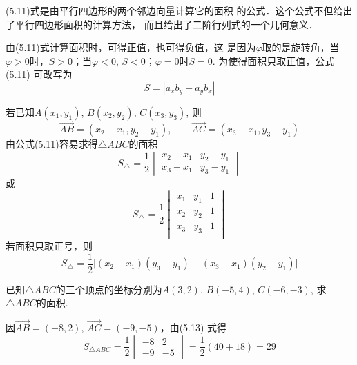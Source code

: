 (5.11)式是由平行四边形的两个邻边向量计算它的面积
的公式．这个公式不但给出了平行四边形面积的计算方法，
而且给出了二阶行列式的一个几何意义．

由(5.11)式计算面积时，可得正值，也可得负值，这
是因为$\varphi$取的是旋转角，当$\varphi>0$时，$S>0$；当$\varphi<0$, 
$S<0$；$\varphi=0$时$S=0$. 为使得面积只取正值，公式(5.11)
可改写为
\begin{equation}
    S=|a_xb_y-a_yb_x|
\end{equation}

若已知$A(x_1,y_1)$, $B(x_2,y_2)$, $C(x_3,y_3)$, 则
\[\Vec{AB}=(x_2-x_1,y_2-y_1),\qquad \Vec{AC}=(x_3-x_1,y_3-y_1)\]
由公式(5.11)容易求得$\triangle ABC$的面积
\begin{equation}
    S_{\triangle}=\frac{1}{2}\begin{vmatrix}
     x_2-x_1&y_2-y_1\\
     x_3-x_1&y_3-y_1   
    \end{vmatrix}
\end{equation}
或
\[ S_{\triangle}=\frac{1}{2}\begin{vmatrix}
    x_1&y_1&1\\
    x_2&y_2  &1\\ 
    x_3&y_3  &1\\ 
   \end{vmatrix}\]
   若面积只取正号，则
\[S_{\triangle}=\frac{1}{2}\Big|(x_2-x_1)(y_3-y_1)-(x_3-x_1)(y_2-y_1)\Big|\]

\begin{example}
      已知$\triangle ABC$的三个顶点的坐标分别为$A(3,2)$, 
$B(-5,4)$, $C(-6,-3)$, 求$\triangle ABC$的面积.
\end{example}

\begin{solution}
因$\Vec{AB}=(-8,2)$, $\Vec{AC}=(-9,-5)$，由(5.13)
式得
\[S_{\triangle ABC}=\frac{1}{2}\begin{vmatrix}
    -8&2\\-9&-5
\end{vmatrix}=\frac{1}{2}(40+18)=29\]
\end{solution}


